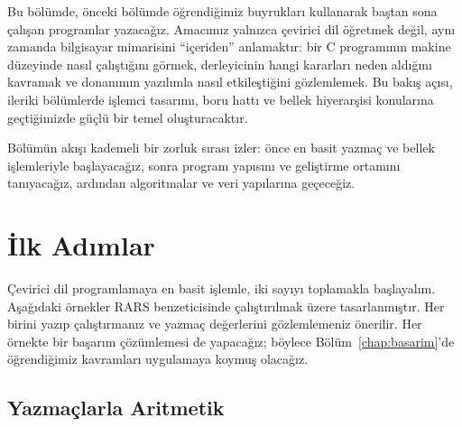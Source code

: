 Bu bölümde, önceki bölümde öğrendiğimiz buyrukları kullanarak baştan sona çalışan programlar yazacağız. Amacımız yalnızca çevirici dil öğretmek değil, aynı zamanda bilgisayar mimarisini ``içeriden'' anlamaktır: bir C programının makine düzeyinde nasıl çalıştığını görmek, derleyicinin hangi kararları neden aldığını kavramak ve donanımın yazılımla nasıl etkileştiğini gözlemlemek. Bu bakış açısı, ileriki bölümlerde işlemci tasarımı, boru hattı ve bellek hiyerarşisi konularına geçtiğimizde güçlü bir temel oluşturacaktır.

Bölümün akışı kademeli bir zorluk sırası izler: önce en basit yazmaç ve bellek işlemleriyle başlayacağız, sonra program yapısını ve geliştirme ortamını tanıyacağız, ardından algoritmalar ve veri yapılarına geçeceğiz.


\section{İlk Adımlar}
\label{sec:ilk-adimlar}

Çevirici dil programlamaya en basit işlemle, iki sayıyı toplamakla başlayalım. Aşağıdaki örnekler RARS benzeticisinde çalıştırılmak üzere tasarlanmıştır. Her birini yazıp çalıştırmanız ve yazmaç değerlerini gözlemlemeniz önerilir. Her örnekte bir başarım çözümlemesi de yapacağız; böylece Bölüm~\ref{chap:basarim}'de öğrendiğimiz kavramları uygulamaya koymuş olacağız.

\subsection{Yazmaçlarla Aritmetik}
\label{subsec:yazmaclarla-aritmetik}

